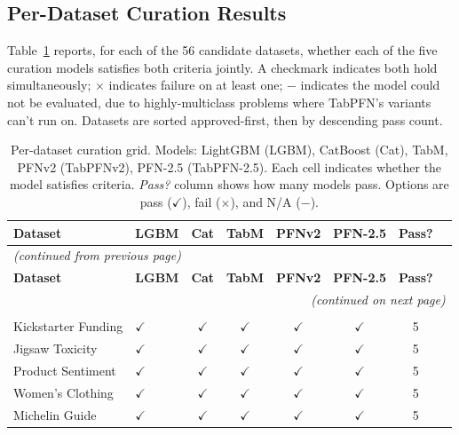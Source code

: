\documentclass{llmxive}
\begin{document}
\subsection{Per-Dataset Curation Results}\label{app:text_curation_grid}

Table~\ref{tab:text_curation_grid} reports, for each of the 56 candidate datasets, whether each of the five curation models satisfies both criteria jointly. A checkmark indicates both hold simultaneously; $\times$ indicates failure on at least one; $-$ indicates the model could not be evaluated, due to highly-multiclass problems where TabPFN's variants can't run on. Datasets are sorted approved-first, then by descending pass count.

\begin{longtable}{llcccccr}
\caption{Per-dataset curation grid. Models: LightGBM (LGBM), CatBoost (Cat), TabM, PFNv2 (TabPFNv2), PFN-2.5 (TabPFN-2.5). Each cell indicates whether the model satisfies criteria. \textit{Pass?} column shows how many models pass. Options are pass ($\checkmark$), fail ($\times$), and N/A ($-$).}
\label{tab:text_curation_grid}\\
\toprule
\textbf{Dataset} & \textbf{LGBM} & \textbf{Cat} & \textbf{TabM} & \textbf{PFNv2} & \textbf{PFN-2.5} & \textbf{Pass?} \\
\midrule
\endfirsthead
\multicolumn{8}{l}{\small\textit{(continued from previous page)}}\\[2pt]
\toprule
\textbf{Dataset} & \textbf{LGBM} & \textbf{Cat} & \textbf{TabM} & \textbf{PFNv2} & \textbf{PFN-2.5} & \textbf{Pass?} \\
\midrule
\endhead
\midrule
\multicolumn{8}{r}{\small\textit{(continued on next page)}}\\
\endfoot
\bottomrule
\endlastfoot
\multicolumn{8}{l}{\textit{Approved (23 datasets)}} \\[2pt]
Kickstarter Funding  & $\checkmark$ & $\checkmark$ & $\checkmark$ & $\checkmark$ & $\checkmark$ & 5 \\
Jigsaw Toxicity    & $\checkmark$ & $\checkmark$ & $\checkmark$ & $\checkmark$ & $\checkmark$ & 5 \\
Product Sentiment  & $\checkmark$ & $\checkmark$ & $\checkmark$ & $\checkmark$ & $\checkmark$ & 5 \\
Women's Clothing & $\checkmark$ & $\checkmark$ & $\checkmark$ & $\checkmark$ & $\checkmark$ & 5 \\
Michelin Guide  & $\checkmark$ & $\checkmark$ & $\checkmark$ & $\checkmark$ & $\checkmark$ & 5 \\

\end{longtable}
\end{document}
